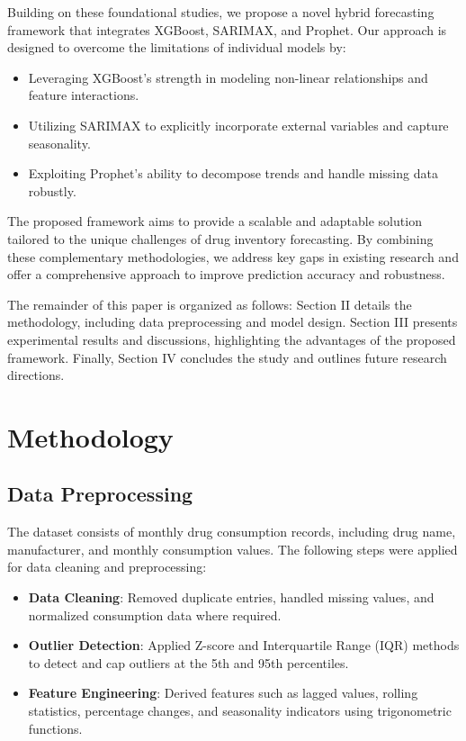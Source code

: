 \documentclass[journal]{IEEEtran}
\begin{document}
Building on these foundational studies, we propose a novel hybrid forecasting framework that integrates XGBoost, SARIMAX, and Prophet. Our approach is designed to overcome the limitations of individual models by:

\begin{itemize}
    \item Leveraging XGBoost's strength in modeling non-linear relationships and feature interactions.
    \item Utilizing SARIMAX to explicitly incorporate external variables and capture seasonality.
    \item Exploiting Prophet's ability to decompose trends and handle missing data robustly.
\end{itemize}

The proposed framework aims to provide a scalable and adaptable solution tailored to the unique challenges of drug inventory forecasting. By combining these complementary methodologies, we address key gaps in existing research and offer a comprehensive approach to improve prediction accuracy and robustness.

The remainder of this paper is organized as follows: Section II details the methodology, including data preprocessing and model design. Section III presents experimental results and discussions, highlighting the advantages of the proposed framework. Finally, Section IV concludes the study and outlines future research directions.

\section{Methodology}
\subsection{Data Preprocessing}
The dataset consists of monthly drug consumption records, including drug name, manufacturer, and monthly consumption values. The following steps were applied for data cleaning and preprocessing:

\begin{itemize}
    \item \textbf{Data Cleaning}: Removed duplicate entries, handled missing values, and normalized consumption data where required.
    \item \textbf{Outlier Detection}: Applied Z-score and Interquartile Range (IQR) methods to detect and cap outliers at the 5th and 95th percentiles.
    \item \textbf{Feature Engineering}: Derived features such as lagged values, rolling statistics, percentage changes, and seasonality indicators using trigonometric functions.
\end{itemize}
\end{document}
